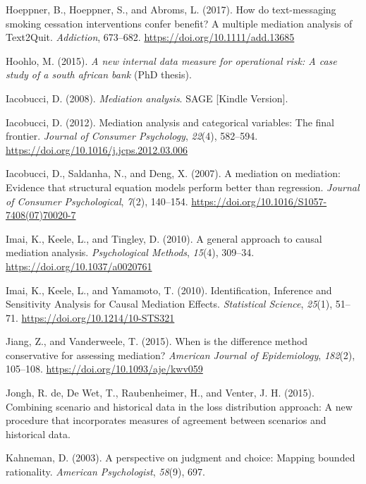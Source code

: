 \documentclass[]{DissertateUSU}
\begin{document}
\hypertarget{ref-Hoeppner2017}{}
Hoeppner, B., Hoeppner, S., and Abroms, L. (2017). How do text-messaging
smoking cessation interventions confer benefit? A multiple mediation
analysis of Text2Quit. \emph{Addiction}, 673--682.
\url{https://doi.org/10.1111/add.13685}

\hypertarget{ref-hoohlo2015new}{}
Hoohlo, M. (2015). \emph{A new internal data measure for operational
risk: A case study of a south african bank} (PhD thesis).

\hypertarget{ref-Iacobucci2008book}{}
Iacobucci, D. (2008). \emph{Mediation analysis}. SAGE {[}Kindle
Version{]}.

\hypertarget{ref-Iacobucci2012}{}
Iacobucci, D. (2012). Mediation analysis and categorical variables: The
final frontier. \emph{Journal of Consumer Psychology}, \emph{22}(4),
582--594. \url{https://doi.org/10.1016/j.jcps.2012.03.006}

\hypertarget{ref-Iacobucci2007}{}
Iacobucci, D., Saldanha, N., and Deng, X. (2007). A mediation on
mediation: Evidence that structural equation models perform better than
regression. \emph{Journal of Consumer Psychological}, \emph{7}(2),
140--154. \url{https://doi.org/10.1016/S1057-7408(07)70020-7}

\hypertarget{ref-Imai2010a}{}
Imai, K., Keele, L., and Tingley, D. (2010). A general approach to
causal mediation analysis. \emph{Psychological Methods}, \emph{15}(4),
309--34. \url{https://doi.org/10.1037/a0020761}

\hypertarget{ref-Imai2010b}{}
Imai, K., Keele, L., and Yamamoto, T. (2010). Identification, Inference
and Sensitivity Analysis for Causal Mediation Effects. \emph{Statistical
Science}, \emph{25}(1), 51--71. \url{https://doi.org/10.1214/10-STS321}

\hypertarget{ref-Jiang2015}{}
Jiang, Z., and Vanderweele, T. (2015). When is the difference method
conservative for assessing mediation? \emph{American Journal of
Epidemiology}, \emph{182}(2), 105--108.
\url{https://doi.org/10.1093/aje/kwv059}

\hypertarget{ref-de2015combining}{}
Jongh, R. de, De Wet, T., Raubenheimer, H., and Venter, J. H. (2015).
Combining scenario and historical data in the loss distribution
approach: A new procedure that incorporates measures of agreement
between scenarios and historical data.

\hypertarget{ref-kahneman2003perspective}{}
Kahneman, D. (2003). A perspective on judgment and choice: Mapping
bounded rationality. \emph{American Psychologist}, \emph{58}(9), 697.
\end{document}
